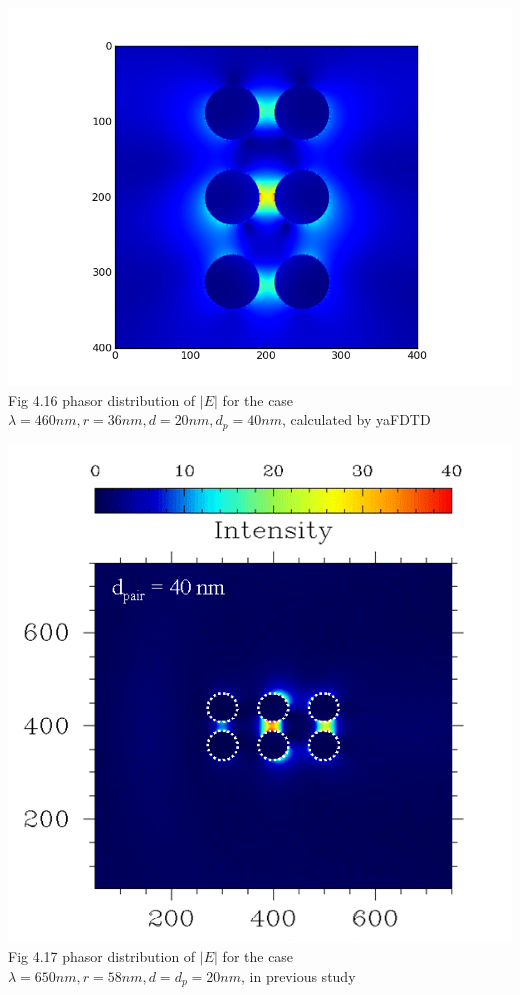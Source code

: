 \documentclass[openany]{book}
\begin{document}
\begin{center}
\includegraphics[scale=0.8]{images/etotal-d40.png}\\
Fig 4.16
phasor distribution of $|E|$ for the case $\lambda = 460nm, r = 36nm, d = 20nm, d_p = 40nm$, calculated by yaFDTD
\end{center}

\begin{center}
\includegraphics[scale=0.5]{images/d40.png}\\
Fig 4.17
phasor distribution of $|E|$ for the case $\lambda = 650nm, r = 58nm, d = d_p = 20nm$, in previous study
\end{center}
\end{document}
